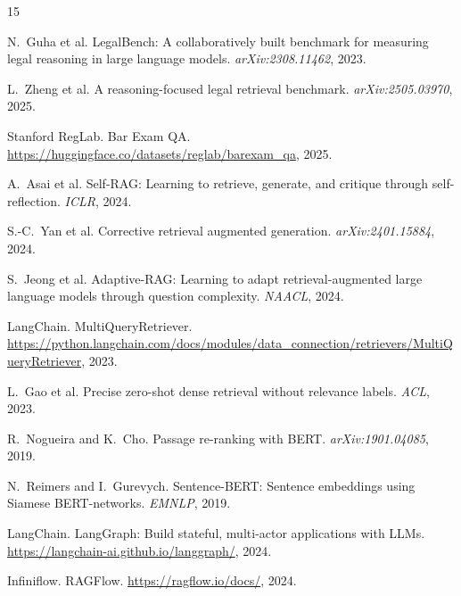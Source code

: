 \documentclass{article}
\begin{document}
{\small

\begin{thebibliography}{15}

N.~Guha et al.
LegalBench: A collaboratively built benchmark for measuring legal reasoning in large language models.
\emph{arXiv:2308.11462}, 2023.

L.~Zheng et al.
A reasoning-focused legal retrieval benchmark.
\emph{arXiv:2505.03970}, 2025.

Stanford RegLab.
Bar Exam QA.
\url{https://huggingface.co/datasets/reglab/barexam_qa}, 2025.

A.~Asai et al.
Self-RAG: Learning to retrieve, generate, and critique through self-reflection.
\emph{ICLR}, 2024.

S.-C.~Yan et al.
Corrective retrieval augmented generation.
\emph{arXiv:2401.15884}, 2024.

S.~Jeong et al.
Adaptive-RAG: Learning to adapt retrieval-augmented large language models through question complexity.
\emph{NAACL}, 2024.

LangChain.
MultiQueryRetriever.
\url{https://python.langchain.com/docs/modules/data_connection/retrievers/MultiQueryRetriever}, 2023.

L.~Gao et al.
Precise zero-shot dense retrieval without relevance labels.
\emph{ACL}, 2023.

R.~Nogueira and K.~Cho.
Passage re-ranking with BERT.
\emph{arXiv:1901.04085}, 2019.

N.~Reimers and I.~Gurevych.
Sentence-BERT: Sentence embeddings using Siamese BERT-networks.
\emph{EMNLP}, 2019.

LangChain.
LangGraph: Build stateful, multi-actor applications with LLMs.
\url{https://langchain-ai.github.io/langgraph/}, 2024.

Infiniflow.
RAGFlow.
\url{https://ragflow.io/docs/}, 2024.

\end{thebibliography}
}
\end{document}
